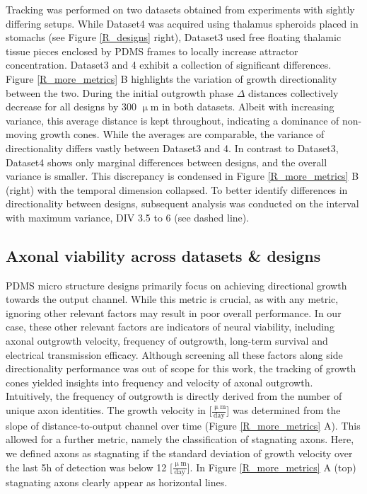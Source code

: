 Tracking was performed on two datasets obtained from experiments with sightly
differing setups. While Dataset4 was acquired using thalamus spheroids placed in
stomachs (see Figure \ref{R_designs} right), Dataset3 used free floating
thalamic tissue pieces enclosed by PDMS frames to locally increase attractor
concentration. Dataset3 and 4 exhibit a collection of significant differences.
Figure \ref{R_more_metrics} B highlights the variation of growth directionality
between the two. During the initial outgrowth phase $\Delta$ distances
collectively decrease for all designs by 300 $\upmu$m in both datasets. Albeit
with increasing variance, this average distance is kept throughout, indicating a
dominance of non-moving growth cones. While the averages are comparable, the
variance of directionality differs vastly between Dataset3 and 4. In contrast to
Dataset3, Dataset4 shows only marginal differences between designs, and the
overall variance is smaller. This discrepancy is condensed in Figure
\ref{R_more_metrics} B (right) with the temporal dimension collapsed. To better
identify differences in directionality between designs, subsequent analysis was
conducted on the interval with maximum variance, DIV 3.5 to 6 (see dashed line).

\subsection{Axonal viability across datasets \& designs}
PDMS micro structure designs primarily focus on achieving directional growth
towards the output channel. While this metric is crucial, as with any metric,
ignoring other relevant factors may result in poor overall performance. In our
case, these other relevant factors are indicators of neural viability, including
axonal outgrowth velocity, frequency of outgrowth, long-term survival and
electrical transmission efficacy. Although screening all these factors along
side directionality performance was out of scope for this work, the tracking of
growth cones yielded insights into frequency and velocity of axonal outgrowth.
Intuitively, the frequency of outgrowth is directly derived from the number of
unique axon identities. The growth velocity in
[$\frac{\mathrm{\upmu}\mathrm{m}}{\mathrm{day}}$] was determined from the slope
of distance-to-output channel over time (Figure \ref{R_more_metrics} A). This
allowed for a further metric, namely the classification of stagnating axons.
Here, we defined axons as stagnating if the standard deviation of growth
velocity over the last 5h of detection was below 12
[$\frac{\mathrm{\upmu}\mathrm{m}}{\mathrm{day}}$]. In Figure
\ref{R_more_metrics} A (top) stagnating axons clearly appear as horizontal
lines. \\

